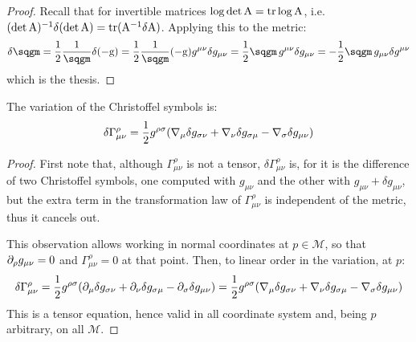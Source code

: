 \begin{proofbox}
  \begin{proof}
    Recall that for invertible matrices $ \log \det \mathrm{A} = \operatorname{tr} \log \mathrm{A} $, i.e. $ (\det \mathrm{A})^{-1} \delta (\det \mathrm{A}) = \operatorname{tr} (\mathrm{A}^{-1} \delta \mathrm{A}) $. Applying this to the metric:
    \begin{equation*}
      \delta \sqgm = \frac{1}{2} \frac{1}{\sqgm} \delta (-\mt{g}) = \frac{1}{2} \frac{1}{\sqgm} (-\mt{g}) g^{\mu \nu} \delta g_{\mu \nu} = \frac{1}{2} \sqgm\, g^{\mu \nu} \delta g_{\mu \nu} = - \frac{1}{2} \sqgm\, g_{\mu \nu} \delta g^{\mu \nu}
    \end{equation*}
    which is the thesis.
  \end{proof}
\end{proofbox}

\begin{lemma}{}{}
  The variation of the Christoffel symbols is:
  \begin{equation}
    \delta \Gamma^\rho_{\mu \nu} = \frac{1}{2} g^{\rho \sigma} ( \nabla_\mu \delta g_{\sigma \nu} + \nabla_\nu \delta g_{\sigma \mu} - \nabla_\sigma \delta g_{\mu \nu} )
  \end{equation}
\end{lemma}

\begin{proofbox}
  \begin{proof}
    First note that, although $ \Gamma^\rho_{\mu \nu} $ is not a tensor, $ \delta \Gamma^\rho_{\mu \nu} $ is, for it is the difference of two Christoffel symbols, one computed with $ g_{\mu \nu} $ and the other with $ g_{\mu \nu} + \delta g_{\mu \nu} $, but the extra term in the transformation law of $ \Gamma^\rho_{\mu \nu} $ is independent of the metric, thus it cancels out.

    This observation allows working in normal coordinates at $ p \in \mathcal{M} $, so that $ \partial_\rho g_{\mu \nu} = 0 $ and $ \Gamma^\rho_{\mu \nu} = 0 $ at that point. Then, to linear order in the variation, at $ p $:
    \begin{equation*}
      \delta \Gamma^\rho_{\mu \nu} = \frac{1}{2} g^{\rho \sigma} ( \partial_\mu \delta g_{\sigma \nu} + \partial_\nu \delta g_{\sigma \mu} - \partial_\sigma \delta g_{\mu \nu} ) = \frac{1}{2} g^{\rho \sigma} ( \nabla_\mu \delta g_{\sigma \nu} + \nabla_\nu \delta g_{\sigma \mu} - \nabla_\sigma \delta g_{\mu \nu} )
    \end{equation*}
    This is a tensor equation, hence valid in all coordinate system and, being $ p $ arbitrary, on all $ \mathcal{M} $.
  \end{proof}
\end{proofbox}

